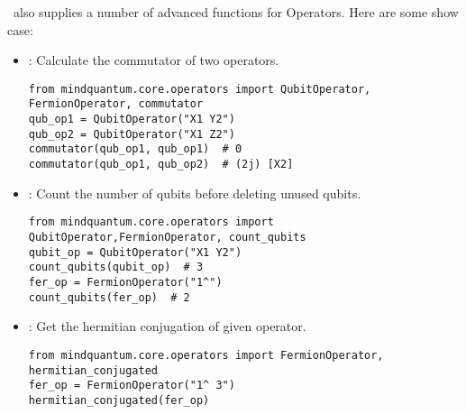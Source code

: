 \MindQuantum\ also supplies a number of advanced functions for Operators. Here are some show case:
\begin{itemize}
    \item {} : Calculate the commutator of two operators.
          \begin{lstlisting}
from mindquantum.core.operators import QubitOperator, FermionOperator, commutator
qub_op1 = QubitOperator("X1 Y2")
qub_op2 = QubitOperator("X1 Z2")
commutator(qub_op1, qub_op1)  # 0
commutator(qub_op1, qub_op2)  # (2j) [X2]
    \end{lstlisting}
    \item {} : Count the number of qubits before deleting unused qubits.
          \begin{lstlisting}
from mindquantum.core.operators import QubitOperator,FermionOperator, count_qubits
qubit_op = QubitOperator("X1 Y2")
count_qubits(qubit_op)  # 3
fer_op = FermionOperator("1^")
count_qubits(fer_op)  # 2
    \end{lstlisting}
    \item {} : Get the hermitian conjugation of given operator.
          \begin{lstlisting}
from mindquantum.core.operators import FermionOperator, hermitian_conjugated
fer_op = FermionOperator("1^ 3")
hermitian_conjugated(fer_op)
    \end{lstlisting}
\end{itemize}

